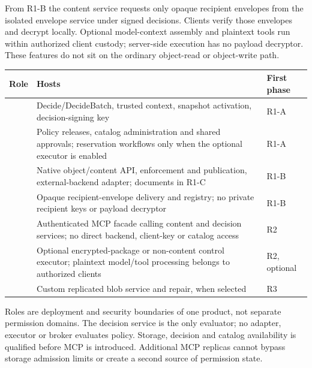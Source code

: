 From R1-B the content service requests only opaque recipient envelopes from the isolated envelope service under signed decisions. Clients verify those envelopes and decrypt locally. Optional model-context assembly and plaintext tools run within authorized client custody; server-side execution has no payload decryptor. These features do not sit on the ordinary object-read or object-write path.
\begin{longtable}{@{}P{0.14\textwidth}P{0.56\textwidth}P{0.14\textwidth}@{}}
\toprule Role & Hosts & First phase\\\midrule\endhead
{} & Decide/DecideBatch, trusted context, snapshot activation, decision-signing key & R1-A\\
 & Policy releases, catalog administration and shared approvals; reservation workflows only when the optional executor is enabled & R1-A\\
 & Native object/content API, enforcement and publication, external-backend adapter; documents in R1-C & R1-B\\
 & Opaque recipient-envelope delivery and registry; no private recipient keys or payload decryptor & R1-B\\
 & Authenticated MCP facade calling content and decision services; no direct backend, client-key or catalog access & R2\\
 & Optional encrypted-package or non-content control executor; plaintext model/tool processing belongs to authorized clients & R2, optional\\
 & Custom replicated blob service and repair, when selected & R3\\
\bottomrule
\end{longtable}
Roles are deployment and security boundaries of one product, not separate permission domains. The decision service is the only evaluator; no adapter, executor or broker evaluates policy. Storage, decision and catalog availability is qualified before MCP is introduced. Additional MCP replicas cannot bypass storage admission limits or create a second source of permission state.

